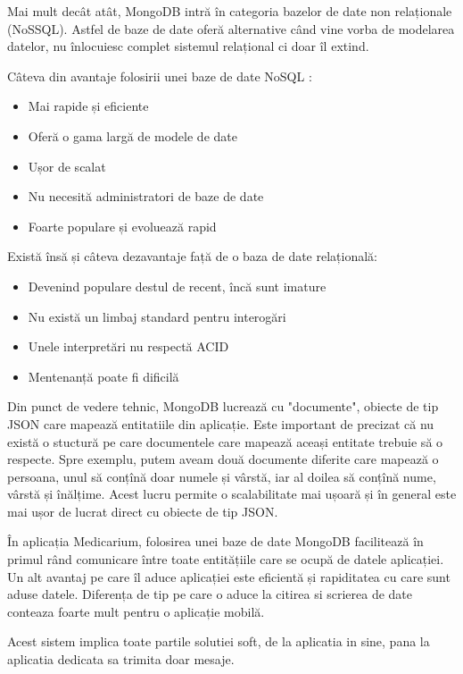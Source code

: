 \documentclass[12pt]{article}
\begin{document}
Mai mult decât atât, MongoDB intră în categoria bazelor de date non 
relaționale (NoSSQL). Astfel de baze de date oferă alternative când vine vorba
de modelarea datelor, nu înlocuiesc complet sistemul relațional ci doar îl extind.

Câteva din avantaje folosirii unei baze de date NoSQL \cite{nayak2013type}:
\begin{itemize}
    \item Mai rapide și eficiente
    \item Oferă o gama largă de modele de date
    \item Ușor de scalat
    \item Nu necesită administratori de baze de date
    \item Foarte populare și evoluează rapid
\end{itemize}

Există însă și câteva dezavantaje față de o baza de date relațională:
\begin{itemize}
    \item Devenind populare destul de recent, încă sunt imature
    \item Nu există un limbaj standard pentru interogări
    \item Unele interpretări nu respectă ACID
    \item Mentenanță poate fi dificilă
\end{itemize}


Din punct de vedere tehnic, MongoDB lucrează cu "documente", obiecte de tip JSON care 
mapează entitatiile din aplicație. Este important de precizat că nu există o stuctură
pe care documentele care mapează aceași entitate trebuie să o respecte. Spre exemplu, putem aveam
două documente diferite care mapează o persoana, unul să conțînă doar numele și vârstă, iar al doilea să conțînă
nume, vârstă și înălțime. Acest lucru permite o scalabilitate mai ușoară și în general este mai
ușor de lucrat direct cu obiecte de tip JSON.

\bigskip

În aplicația Medicarium, folosirea unei baze de date MongoDB facilitează în primul rând comunicare
între toate entitățiile care se ocupă de datele aplicației.
Un alt avantaj pe care îl aduce aplicației este eficientă și rapiditatea cu care sunt aduse datele.
Diferența de tip pe care o aduce la citirea si scrierea de date conteaza foarte mult pentru o aplicație mobilă.

Acest sistem implica toate partile solutiei soft, de la aplicatia in sine, pana la
aplicatia dedicata sa trimita doar mesaje.
\end{document}
